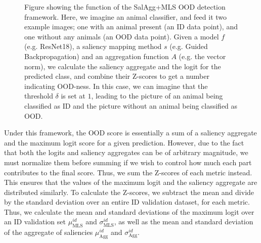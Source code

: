 \documentclass[runningheads]{llncs}
\begin{document}
\begin{figure}
    \caption{Figure showing the function of the SalAgg+MLS OOD detection framework. Here, we imagine an animal classifier, and feed it two example images; one with an animal present (an ID data point), and one without any animals (an OOD data point). Given a model $f$ (e.g. ResNet18), a saliency mapping method $s$ (e.g. Guided Backpropagation) and an aggregation function $A$ (e.g. the vector norm), we calculate the saliency aggregate and the logit for the predicted class, and combine their Z-scores to get a number indicating OOD-ness. In this case, we can imagine that the threshold $\delta$ is set at $1$, leading to the picture of an animal being classified as ID and the picture without an animal being classified as OOD.}
    \label{fig:salagg}
\end{figure}


Under this framework, the OOD score is essentially a sum of a saliency aggregate and the maximum logit score for a given prediction. However, due to the fact that both the logits and saliency aggregates can be of arbitrary magnitude, we must normalize them before summing if we wish to control how much each part contributes to the final score. Thus, we sum the Z-scores of each metric instead. This ensures that the values of the maximum logit and the saliency aggregate are distributed similarly. To calculate the Z-scores, we subtract the mean and divide by the standard deviation over an entire ID validation dataset, for each metric. Thus, we calculate the mean and standard deviations of the maximum logit over an ID validation set $\mu_{\text{MLS}}^{id}$ and $\sigma_{\text{MLS}}^{id}$, as well as the mean and standard deviation of the aggregate of saliencies $\mu_{\text{Agg}}^{id}$ and $\sigma_{\text{Agg}}^{id}$.
\end{document}
